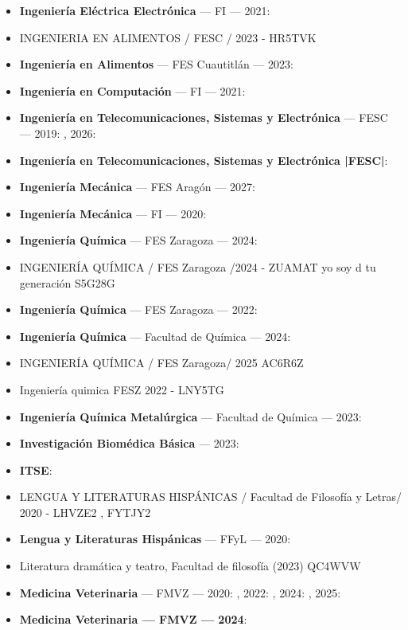 \begin{itemize}[leftmargin=*]
  \item \textbf{Ingeniería Eléctrica Electrónica} --- FI --- 2021: 
  \item INGENIERIA EN ALIMENTOS / FESC / 2023 - HR5TVK
  \item \textbf{Ingeniería en Alimentos} --- FES Cuautitlán --- 2023: 
  \item \textbf{Ingeniería en Computación} --- FI --- 2021: 
  \item \textbf{Ingeniería en Telecomunicaciones, Sistemas y Electrónica} --- FESC --- 2019: , 2026: 
  \item \textbf{Ingeniería en Telecomunicaciones, Sistemas y Electrónica |FESC|}: 
  \item \textbf{Ingeniería Mecánica} --- FES Aragón --- 2027: 
  \item \textbf{Ingeniería Mecánica} --- FI --- 2020: 
  \item \textbf{Ingeniería Química} --- FES Zaragoza --- 2024: 
  \item INGENIERÍA QUÍMICA / FES Zaragoza /2024 - ZUAMAT yo soy d tu generación S5G28G
  \item \textbf{Ingeniería Química} --- FES Zaragoza --- 2022: 
  \item \textbf{Ingeniería Química} --- Facultad de Química --- 2024: 
  \item INGENIERÍA QUÍMICA / FES Zaragoza/ 2025 AC6R6Z
  \item Ingeniería quimica FESZ 2022 - LNY5TG
  \item \textbf{Ingeniería Química Metalúrgica} --- Facultad de Química --- 2023: 
  \item \textbf{Investigación Biomédica Básica} --- 2023: 
  \item \textbf{ITSE}: 
  \item LENGUA Y LITERATURAS HISPÁNICAS / Facultad de Filosofía y Letras/ 2020 - LHVZE2 , FYTJY2
  \item \textbf{Lengua y Literaturas Hispánicas} --- FFyL --- 2020: 
  \item Literatura dramática y teatro, Facultad de filosofía (2023) QC4WVW
  \item \textbf{Medicina Veterinaria} --- FMVZ --- 2020: , 2022: , 2024: , 2025: 
  \item \textbf{Medicina Veterinaria --- FMVZ --- 2024}: 

\end{itemize}
